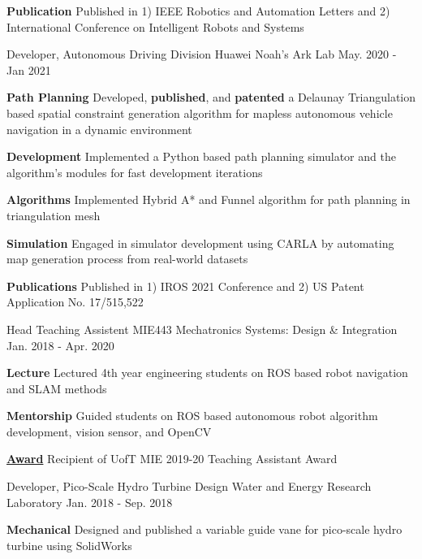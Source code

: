 \begin{cventries}
{\begin{cvitems}
{			}
			\item {
				\textbf{Publication} Published in 1) IEEE Robotics and Automation Letters and 2) International Conference on Intelligent Robots and Systems
			}
		\end{cvitems}
	}
	\cventry
	{Developer, Autonomous Driving Division}
	{Huawei Noah’s Ark Lab}
	{May. 2020 - Jan 2021}
	{}
	{
		\begin{cvitems}
			\item {
				\textbf{Path Planning} Developed, \textbf{published}, and \textbf{patented} a Delaunay Triangulation based spatial constraint generation algorithm for mapless autonomous vehicle navigation in a dynamic environment
			}
			\item {
				\textbf{Development} Implemented a Python based path planning simulator and the algorithm's modules for fast development iterations
			}
			\item {
				\textbf{Algorithms} Implemented Hybrid A* and Funnel algorithm for path planning in triangulation mesh
			}
			\item {
				\textbf{Simulation} Engaged in simulator development using CARLA by automating map generation process from real-world datasets
			}
			\item{
				\textbf{Publications} Published in 1) IROS 2021 Conference and 2) US Patent Application No. 17/515,522
			}
		\end{cvitems}
	}
	\cventry
	{Head Teaching Assistent}
	{MIE443 Mechatronics Systems: Design \& Integration}
	{Jan. 2018 - Apr. 2020}
	{}
	{
		\begin{cvitems}
			\item {
				\textbf{Lecture} Lectured 4th year engineering students on ROS based robot navigation and SLAM methods
			}
			\item {
				\textbf{Mentorship} Guided students on ROS based autonomous robot algorithm development, vision sensor, and OpenCV
			}
			\item \textbf{\href{https://www.mie.utoronto.ca/congratulations-2019-20-teaching-assistant-award-winners-lap-tak-chu-richard-hu-behzad-khamidehi-ben-leung-and-khalil-sidawi/}{Award}} Recipient of UofT MIE 2019-20 Teaching Assistant Award
		\end{cvitems}
	}
	\cventry
	{Developer, Pico-Scale Hydro Turbine Design}
	{Water and Energy Research Laboratory}
	{Jan. 2018 - Sep. 2018}
	{}
	{
		\begin{cvitems}
			\item {\textbf{Mechanical} Designed and published a variable guide vane for pico-scale hydro turbine using SolidWorks}

\end{cvitems}}
\end{cventries}
